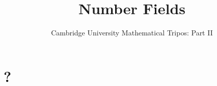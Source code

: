 \documentclass{article}
\title{Number Fields}
\author{Cambridge University Mathematical Tripos: Part II}
\begin{document}
\maketitle

\tableofcontentsnewpage{}

\section{?}
\end{document}
